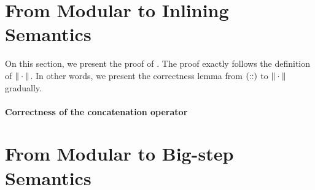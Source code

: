 \section{From Modular to Inlining Semantics}

On this section, we present the proof of . The
proof exactly follows the definition of $\| \cdot \|$. In other
words, we present the correctness lemma from $(::)$ to
$\| \cdot \|$ gradually.

\paragraph{Correctness of the concatenation operator}



\section{From Modular to Big-step Semantics}



